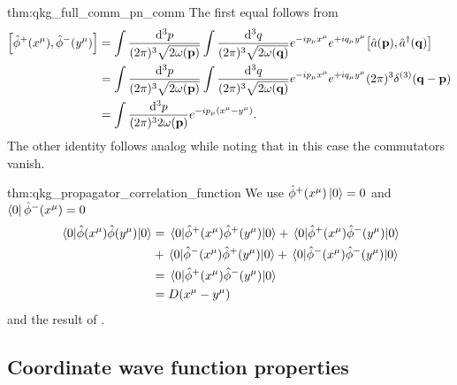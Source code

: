 \begin{delayedproof}{thm:qkg_full_comm_pn_comm}
	The first equal follows from
	\begin{equation*}
		\begin{split}
			\comm{\hat\phi^+(x^\mu)}{\hat\phi^-(y^\mu)}
			&=
			\int\frac{\dd[3]{p}}{(2\pi)^3\sqrt{2\omega(\vb{p})}}
			\int\frac{\dd[3]{q}}{(2\pi)^3\sqrt{2\omega(\vb{q})}}
			e^{-ip_\mu x^\mu}
			e^{+iq_\mu y^\mu}
			\comm{\hat{a}(\vb{p})}{\hat{a}^\dagger(\vb{q})}
			\\
			&=
			\int\frac{\dd[3]{p}}{(2\pi)^3\sqrt{2\omega(\vb{p})}}
			\int\frac{\dd[3]{q}}{(2\pi)^3\sqrt{2\omega(\vb{q})}}
			e^{-ip_\mu x^\mu}
			e^{+iq_\mu y^\mu}
			(2\pi)^3
			\delta^{(3)}(\vb{q}-\vb{p})
			\\
			&=
			\int\frac{\dd[3]{p}}{(2\pi)^32\omega(\vb{p})}
			e^{-ip_\mu (x^\mu-y^\mu)}
			.
		\end{split}
	\end{equation*}
	The other identity follows analog while noting that in this case the commutators vanish.
\end{delayedproof}
\begin{delayedproof}{thm:qkg_propagator_correlation_function}
	We use $\hat\phi^+(x^\mu)\ket{0}=0$ and $\bra{0}\hat\phi^-(x^\mu)=0$
	\begin{equation*}
		\begin{split}
			\expval{\hat\phi(x^\mu)\hat\phi(y^\mu)}{0}
			&=
			\expval{\hat\phi^+(x^\mu)\hat\phi^+(y^\mu)}{0}
			+
			\expval{\hat\phi^+(x^\mu)\hat\phi^-(y^\mu)}{0}
			\\
			&+
			\expval{\hat\phi^-(x^\mu)\hat\phi^+(y^\mu)}{0}
			+
			\expval{\hat\phi^-(x^\mu)\hat\phi^-(y^\mu)}{0}
			\\
			&=
			\expval{\hat\phi^+(x^\mu)\hat\phi^-(y^\mu)}{0}
			\\
			&=
			D(x^\mu-y^\mu)
		\end{split}	
	\end{equation*}
	and the result of .
\end{delayedproof}

\subsection{Coordinate wave function properties}

